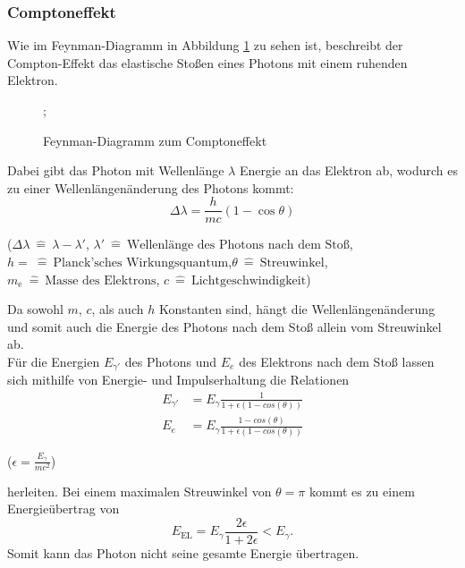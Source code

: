 \subsubsection{Comptoneffekt}
Wie im Feynman-Diagramm in Abbildung \ref{fig:compton} zu sehen ist, beschreibt der Compton-Effekt das elastische Stoßen eines Photons mit einem ruhenden Elektron.
\begin{figure}[H]
\centering
{};
\caption{Feynman-Diagramm zum Comptoneffekt}
\label{fig:compton}
\end{figure}
Dabei gibt das Photon mit Wellenlänge $\lambda$ Energie an das Elektron ab, wodurch es zu einer Wellenlängenänderung des Photons kommt:
\begin{equation}
  \Delta \lambda = \frac{h}{mc}\left( 1-\cos{\theta} \right)
\end{equation}
\begin{center}
    \tiny {($\Delta \lambda \: \hat{=} \: \lambda - \lambda '$, $ \lambda '\: \hat{=} \:\text{Wellenlänge des Photons nach dem Stoß}$, $h=\: \hat{=} \:\text{Planck'sches Wirkungsquantum}$,$\theta\: \hat{=} \:\text{Streuwinkel}$, $m_\text{e} \: \hat{=} \:\text{Masse des Elektrons}$, $c \: \hat{=} \: \text{Lichtgeschwindigkeit}$)}
\end{center}
Da sowohl $m$, $c$, als auch $h$ Konstanten sind, hängt die Wellenlängenänderung und somit auch die Energie des Photons nach dem Stoß allein vom Streuwinkel ab.\\
Für die Energien $E_{\gamma'}$ des Photons und $E_e$ des Elektrons nach dem Stoß lassen sich mithilfe von Energie- und Impulserhaltung die Relationen 
\begin{align}
    E_{\gamma'} &= E_\gamma \frac{1}{1+\epsilon (1-cos(\theta))}\\
    E_e &= E_\gamma \frac{1-cos(\theta)}{1+\epsilon (1-cos(\theta))}
\end{align} 
\begin{center}
    \tiny{($\epsilon = \frac{E_\gamma}{mc^2}$)}
\end{center}
herleiten. Bei einem maximalen Streuwinkel von $\theta = \pi$ kommt es zu einem Energieübertrag von 
\begin{equation}
    E_\text{EL} = E_\gamma \frac{2 \epsilon}{1 + 2 \epsilon} < E_\gamma .
\end{equation}
Somit kann das Photon nicht seine gesamte Energie übertragen.

